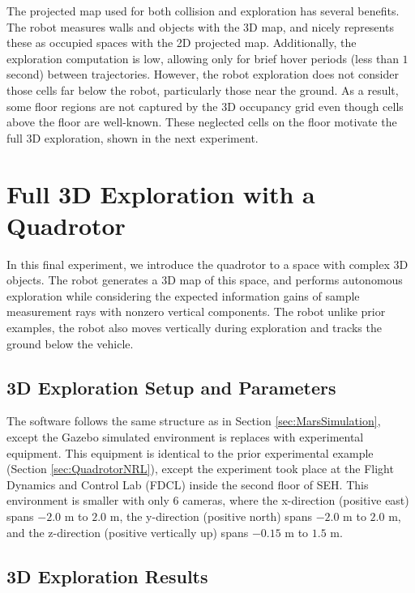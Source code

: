 The projected map used for both collision and exploration has several benefits. The robot measures walls and objects with the 3D map, and nicely represents these as occupied spaces with the 2D projected map. Additionally, the exploration computation is low, allowing only for brief hover periods (less than $1$ second) between trajectories. However, the robot exploration does not consider those cells far below the robot, particularly those near the ground. As a result, some floor regions are not captured by the 3D occupancy grid even though cells above the floor are well-known. These neglected cells on the floor motivate the full 3D exploration, shown in the next experiment.



\section{Full 3D Exploration with a Quadrotor}
\label{sec:QuadrotorSEH}

In this final experiment, we introduce the quadrotor to a space with complex 3D objects. The robot generates a 3D map of this space, and performs autonomous exploration while considering the expected information gains of sample measurement rays with nonzero vertical components. The robot unlike prior examples, the robot also moves vertically during exploration and tracks the ground below the vehicle.

\subsection{3D Exploration Setup and Parameters}
The software follows the same structure as in Section \ref{sec:MarsSimulation}, except the Gazebo simulated environment is replaces with experimental equipment. This equipment is identical to the prior experimental example (Section \ref{sec:QuadrotorNRL}), except the experiment took place at the Flight Dynamics and Control Lab (FDCL) inside the second floor of SEH. This environment is smaller with only $6$ cameras, where the x-direction (positive east) spans $-2.0$ m to $2.0$ m, the y-direction (positive north) spans $-2.0$ m to $2.0$ m, and the z-direction (positive vertically up) spans $-0.15$ m to $1.5$ m.


\subsection{3D Exploration Results}




